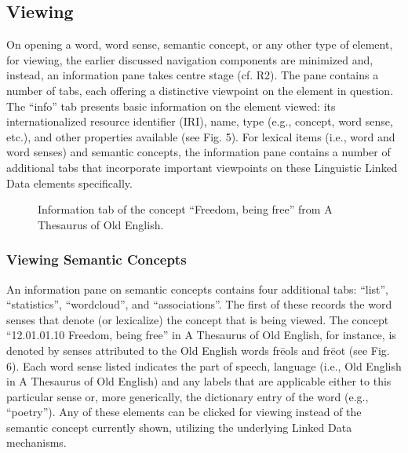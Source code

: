 \subsection{Viewing}
On opening a word, word sense, semantic concept, or any other type of element, for viewing, the earlier discussed navigation components are minimized and, instead, an information pane takes centre stage (cf. R2). The pane contains a number of tabs, each offering a distinctive viewpoint on the element in question. The “info” tab presents basic information on the element viewed: its internationalized resource identifier (IRI), name, type (e.g., concept, word sense, etc.), and other properties available (see Fig. 5). For lexical items (i.e., word and word senses) and semantic concepts, the information pane contains a number of additional tabs that incorporate important viewpoints on these Linguistic Linked Data elements specifically.

\begin{figure}[htbp]
	\caption[]{\label{fig:Stolk2021a:Fig5} Information tab of the concept “Freedom, being free” from A Thesaurus of Old English.}
\end{figure}


\subsubsection{Viewing Semantic Concepts}
An information pane on semantic concepts contains four additional tabs: “list”, “statistics”, “wordcloud”, and “associations”. The first of these records the word senses that denote (or lexicalize) the concept that is being viewed. The concept “12.01.01.10 Freedom, being free” in A Thesaurus of Old English, for instance, is denoted by senses attributed to the Old English words frēols and frēot (see Fig. 6). Each word sense listed indicates the part of speech, language (i.e., Old English in A Thesaurus of Old English) and any labels that are applicable either to this particular sense or, more generically, the dictionary entry of the word (e.g., “poetry”). Any of these elements can be clicked for viewing instead of the semantic concept currently shown, utilizing the underlying Linked Data mechanisms.

